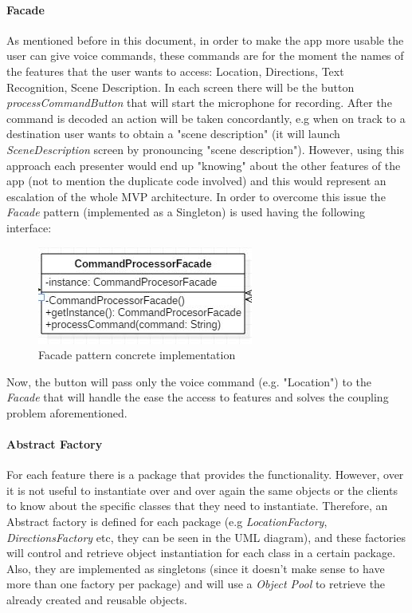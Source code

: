 \documentclass{article}[11]
\begin{document}
  \paragraph{Facade\\}
  	As mentioned before in this document, in order to make the app more usable the user can give voice commands, these commands are for the moment the names of the features that the user wants to access: Location, Directions, Text Recognition, Scene Description. In each screen there will be the button \emph{processCommandButton} that will start the microphone for recording. After the command is decoded an action will be taken concordantly, e.g when on track to a destination user wants to obtain a "scene description" (it will launch \emph{SceneDescription} screen by pronouncing "scene description"). However, using this approach each presenter would end up "knowing" about the other features of the app (not to mention the duplicate code involved) and this would represent an escalation of the whole MVP architecture. In order to overcome this issue the \emph{Facade} pattern (implemented as a Singleton) is used having the following interface:
  	
  	\begin{figure}[H]
  		\centering
		\includegraphics[scale=1]{./imgs/FacadeImpl}  	
  		\caption{Facade pattern concrete implementation}
  	\end{figure}
  	
  	Now, the button will pass only the voice command (e.g. "Location") to the \emph{Facade} that will handle the ease the access to features and solves the coupling problem aforementioned.
  	
  	\paragraph{Abstract Factory\\}
  	For each feature there is a package that provides the functionality. However, over it is not useful to instantiate over and over again the same objects or the clients to know about the specific classes that they need to instantiate. Therefore, an Abstract factory is defined for each package (e.g \emph{LocationFactory}, \emph{DirectionsFactory} etc, they can be seen in the UML diagram), and these factories will control and retrieve object instantiation for each class in a certain package. Also, they are implemented as singletons (since it doesn't make sense to have more than one factory per package) and will use a \emph{Object Pool} to retrieve the already created and reusable objects.
  	
\end{document}
